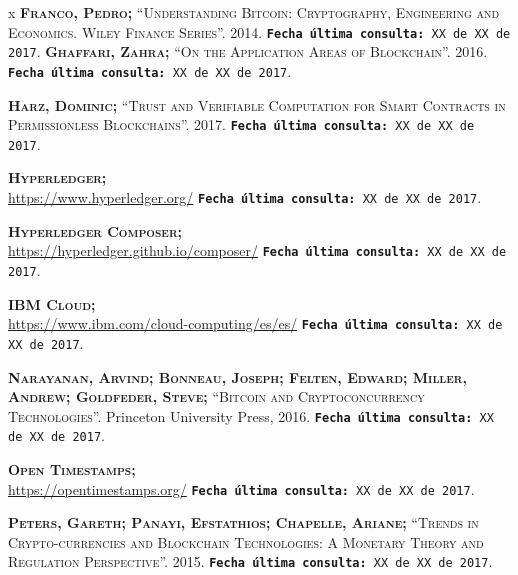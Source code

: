 \documentclass[12pt,a4paper, twoside]{report}
\begin{document}
\begin{thebibliography} {x}
		 \textsc{\textbf{Franco, Pedro; }}\textsc{“Understanding Bitcoin: Cryptography, Engineering and Economics. Wiley Finance Series”.} 2014. 
		\newline \texttt{\textbf{Fecha última consulta:} XX de XX de 2017}.				
		 \textsc{\textbf{Ghaffari, Zahra; }}\textsc{“On the Application Areas of Blockchain”.} 2016.
		\newline \texttt{\textbf{Fecha última consulta:} XX de XX de 2017}.
		
		 \textsc{\textbf{Harz, Dominic; }}\textsc{“Trust and Verifiable Computation for Smart Contracts in Permissionless Blockchains”.} 2017.
		\newline \texttt{\textbf{Fecha última consulta:} XX de XX de 2017}.
		
		 \textsc{\textbf{Hyperledger; }} \\ 
		\url{https://www.hyperledger.org/} 
		\newline \texttt{\textbf{Fecha última consulta:} XX de XX de 2017}.
		
		 \textsc{\textbf{Hyperledger Composer; }} \\ 
		\url{https://hyperledger.github.io/composer/} 
		\newline \texttt{\textbf{Fecha última consulta:} XX de XX de 2017}.
		
		 \textsc{\textbf{IBM Cloud; }} \\ 
		\url{https://www.ibm.com/cloud-computing/es/es/} 
		\newline \texttt{\textbf{Fecha última consulta:} XX de XX de 2017}.	
		
		 \textsc{\textbf{Narayanan, Arvind; Bonneau, Joseph; Felten, Edward; Miller, Andrew; Goldfeder, Steve; }}\textsc{“Bitcoin and Cryptoconcurrency Technologies”.} Princeton University Press, 2016.
		\newline \texttt{\textbf{Fecha última consulta:} XX de XX de 2017}.
		
		 \textsc{\textbf{Open Timestamps; }} \\ 
		\url{https://opentimestamps.org/} 
		\newline \texttt{\textbf{Fecha última consulta:} XX de XX de 2017}.
		
		 \textsc{\textbf{Peters, Gareth; Panayi, Efstathios; Chapelle, Ariane; }}\textsc{“Trends in Crypto-currencies and Blockchain Technologies: A Monetary Theory and Regulation Perspective”.} 2015.
		\newline \texttt{\textbf{Fecha última consulta:} XX de XX de 2017}.
		

\end{thebibliography}
\end{document}
